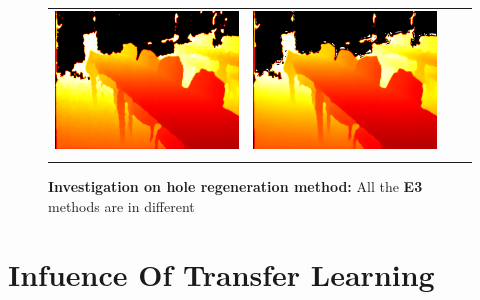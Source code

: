 \begin{figure}
\begin{tabular}{@{}c@{ }c@{ }c@{ }c@{}}
\includegraphics[width=.3\linewidth]{Figures/results/s2_Holes/2Truth.png}&
\includegraphics[width=.3\linewidth]{Figures/results/s2_Holes/2Predicted.png}\\[-1ex]
&\mycaption{} & \mycaption{} & \mycaption{} \\
\end{tabular}
\caption{\textbf{Investigation on hole regeneration method:} All the \textbf{E3} methods are in different  }%
\label{fig:results_S2}
\end{figure}




 \section{Infuence Of Transfer Learning}
 
